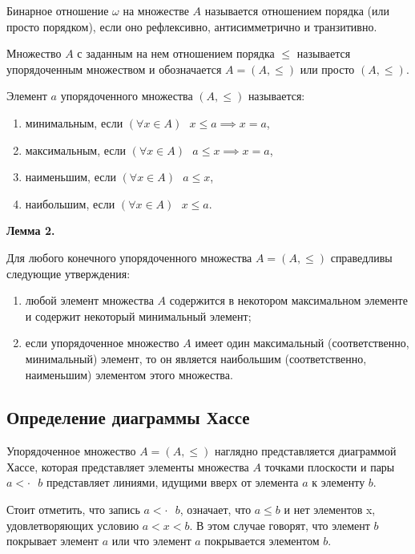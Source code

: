 \documentclass[bachelor, och, labwork]{shiza}
\begin{document}
        Бинарное отношение $\omega$ на множестве $A$ называется отношением порядка (или просто порядком), если оно
        рефлексивно, антисимметрично и транзитивно.

        Множество $A$ с заданным на нем отношением порядка $\leq$ называется упорядоченным множеством и обозначается $A
        = (A, \leq)$ или просто $(A, \leq)$.

        Элемент $a$ упорядоченного множества $(A, \leq)$ называется:
        \begin{enumerate}
            \item минимальным, если $(\forall x \in A) \text{ } x \leq a \implies x = a$,
            \item максимальным, если $(\forall x \in A) \text{ } a \leq x \implies x = a$,
            \item наименьшим, если $(\forall x \in A) \text{ } a \leq x$,
            \item наибольшим, если $(\forall x \in A) \text{ } x \leq a$.
        \end{enumerate}

        \textbf{Лемма 2.}

        Для любого конечного упорядоченного множества $A = (A, \leq)$ справедливы следующие утверждения:
        \begin{enumerate}
            \item любой элемент множества $A$ содержится в некотором максимальном элементе и содержит некоторый
            минимальный элемент;
            \item если упорядоченное множество $A$ имеет один максимальный (соответственно, минимальный) элемент, то он
            является наибольшим (соответственно, наименьшим) элементом этого множества.
        \end{enumerate}

    \subsection{Определение диаграммы Хассе}

        Упорядоченное множество $A = (A, \leq)$ наглядно представляется диаграммой Хассе, которая представляет элементы множества $A$ точками 
        плоскости и пары $a <\cdot \text{ } b$ представляет линиями, идущими вверх от элемента $a$ к элементу $b$.

        Стоит отметить, что запись $a <\cdot \text{ } b$, означает, что $a \leq b$ и нет элементов x, удовлетворяющих условию $a < x < b$.
        В этом случае говорят, что элемент $b$ покрывает элемент $a$ или что элемент $a$ покрывается элементом $b$.
        
\end{document}

